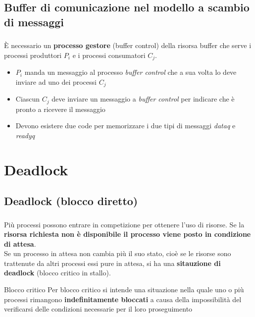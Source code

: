 \documentclass{beamer}
\newenvironment{mainframe}{
	\begin{frame}
		\frametitle{\insertsubsection}
		\framesubtitle{\insertsection}
	}{
	\end{frame}
}
\begin{document}
\subsection{Buffer di comunicazione nel modello a scambio di messaggi}
\begin{mainframe}
	È necessario un \textbf{processo gestore} (buffer control) della risorsa buffer che serve i processi produttori $P_i$ e i processi consumatori $C_j$.
	\begin{itemize}
		\item $P_i$ manda un messaggio al processo \textit{buffer control} che a sua volta lo deve inviare ad uno dei processi $C_j$
		\item Ciascun $C_j$ deve inviare un messaggio a \textit{buffer control} per indicare che è pronto a ricevere il messaggio
		\item Devono esistere due code per memorizzare i due tipi di messaggi \textit{dataq} e \textit{readyq}
	\end{itemize}
\end{mainframe}
\section{Deadlock}
\subsection{Deadlock (blocco diretto)}
\begin{mainframe}
	Più processi possono entrare in competizione per ottenere l'uso di risorse. Se la \textbf{risorsa richiesta non è disponibile il processo viene posto in condizione di attesa}.\\
	Se un processo in attesa non cambia più il suo stato, cioè se le risorse sono trattenute da altri processi essi pure in attesa, si ha una \textbf{sitauzione di deadlock} (blocco critico in stallo).\\
	\begin{block}{Blocco critico}
		Per blocco critico si intende una situazione nella quale uno o più processi rimangono \textbf{indefinitamente bloccati} a causa della impossibilità del verificarsi delle condizioni necessarie per il loro proseguimento
	\end{block}
\end{mainframe}
\end{document}
